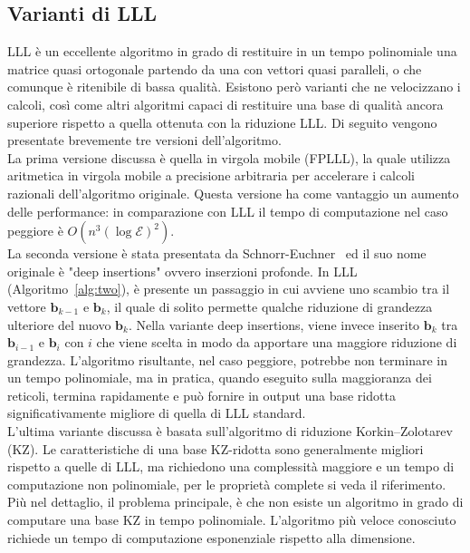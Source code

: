 \subsection{Varianti di LLL}

LLL è un eccellente algoritmo in grado di restituire in un tempo polinomiale una matrice 
quasi ortogonale partendo da una con vettori quasi paralleli, o che comunque è ritenibile 
di bassa qualità. Esistono però varianti che ne velocizzano i calcoli, 
così come altri algoritmi capaci di restituire una base di qualità ancora superiore 
rispetto a quella ottenuta con la riduzione LLL. Di seguito vengono presentate 
brevemente tre versioni dell'algoritmo. 
\\
La prima versione discussa è quella in virgola mobile (FPLLL)\cite{FPLLL05}, la quale 
utilizza aritmetica in virgola mobile a 
precisione arbitraria per accelerare i calcoli razionali dell'algoritmo originale. 
Questa versione ha come vantaggio un aumento delle performance: in comparazione con LLL
il tempo di computazione nel caso peggiore è $O(n^3 (\log\mathcal{E})^2)$. 
\\ 
La seconda versione è stata presentata da Schnorr-Euchner~\cite{DEEPLLL94} ed il suo nome
originale è "deep insertions" ovvero inserzioni profonde. In LLL (Algoritmo~\ref*{alg:two}),
è presente un passaggio in cui avviene uno scambio tra il vettore 
$\mathbf{b}_{k-1}$ e $\mathbf{b}_{k}$, il quale di solito permette qualche riduzione di grandezza
ulteriore del nuovo $\mathbf{b}_{k}$. Nella variante deep insertions, viene invece inserito
$\mathbf{b}_{k}$ tra $\mathbf{b}_{i-1}$ e $\mathbf{b}_{i}$ con $i$ che viene scelta in modo
da apportare una maggiore riduzione di grandezza. L'algoritmo risultante, nel caso peggiore,
potrebbe non terminare in un tempo polinomiale, ma in pratica, quando eseguito sulla maggioranza
dei reticoli, termina rapidamente e può fornire in output una base ridotta 
significativamente migliore di quella di LLL standard. 
\\
L'ultima variante discussa è basata sull'algoritmo di riduzione 
Korkin–Zolotarev (KZ)\cite[Sezione 18.5]{Galbraith18}. Le caratteristiche di una base KZ-ridotta
sono generalmente migliori rispetto a quelle di LLL, ma richiedono una complessità maggiore
e un tempo di computazione non polinomiale, per le proprietà complete si veda il riferimento. 
Più nel dettaglio, il problema principale, è che non esiste un algoritmo in grado di computare
una base KZ in tempo polinomiale. L'algoritmo più veloce conosciuto richiede un tempo
di computazione esponenziale rispetto alla dimensione. 
